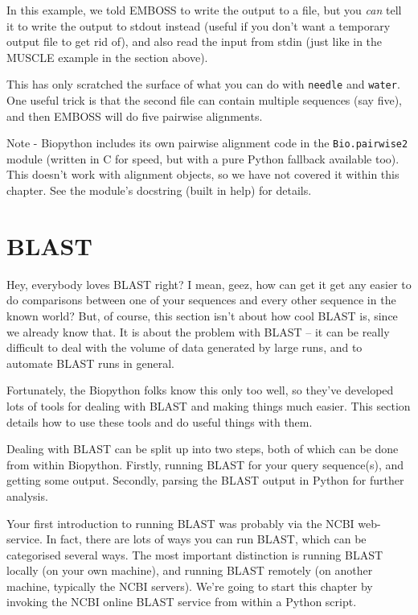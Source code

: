 \documentclass{report}
\begin{document}
In this example, we told EMBOSS to write the output to a file, but you
\emph{can} tell it to write the output to stdout instead (useful if you
don't want a temporary output file to get rid of), and also read the
input from stdin (just like in the MUSCLE example in the section above).

This has only scratched the surface of what you can do with \texttt{needle}
and \texttt{water}. One useful trick is that the second file can contain
multiple sequences (say five), and then EMBOSS will do five pairwise
alignments.

Note - Biopython includes its own pairwise alignment code in the \verb|Bio.pairwise2|
module (written in C for speed, but with a pure Python fallback available too). This
doesn't work with alignment objects, so we have not covered it within this chapter.
See the module's docstring (built in help) for details.

\chapter{BLAST}
\label{chapter:blast}
Hey, everybody loves BLAST right? I mean, geez, how can get it get any easier to do comparisons between one of your sequences and every other sequence in the known world? But, of course, this section isn't about how cool BLAST is, since we already know that. It is about the problem with BLAST -- it can be really difficult to deal with the volume of data generated by large runs, and to automate BLAST runs in general.

Fortunately, the Biopython folks know this only too well, so they've developed lots of tools for dealing with BLAST and making things much easier. This section details how to use these tools and do useful things with them.

Dealing with BLAST can be split up into two steps, both of which can be done from within Biopython.
Firstly, running BLAST for your query sequence(s), and getting some output.
Secondly, parsing the BLAST output in Python for further analysis.

Your first introduction to running BLAST was probably via the NCBI web-service.
In fact, there are lots of ways you can run BLAST, which can be categorised several ways.
The most important distinction is running BLAST locally (on your own machine),
and running BLAST remotely (on another machine, typically the NCBI servers).
We're going to start this chapter by invoking the NCBI online BLAST service
from within a Python script.
\end{document}
